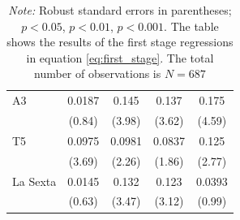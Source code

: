 \documentclass[12pt]{article}
\begin{document}
\begin{table}[htbp]
\begin{tabular}{lcccc}
		A3             &  0.0187         &  0.145\sym{***}&  0.137\sym{***}&  0.175\sym{***}\\
		&  (0.84)         &  (3.98)         &  (3.62)         &  (4.59)         \\
		T5             &  0.0975\sym{***}&  0.0981\sym{*}  &  0.0837         &  0.125\sym{**}  \\
		&  (3.69)         &  (2.26)         &  (1.86)         &  (2.77)         \\
		La Sexta       &  0.0145         &  0.132\sym{***}&  0.123\sym{**} &  0.0393         \\
		&  (0.63)         &  (3.47)         &  (3.12)         &  (0.99)         \\
		\hline\hline
	\end{tabular}
	
	\caption*{\scriptsize\emph{Note:} Robust standard errors in  parentheses;\quad \sym{*} $p<0.05$, \sym{**} $p<0.01$, \sym{***} $p<0.001$. The table shows the results of the first stage regressions in equation \ref{eq:first_stage}. The total number of observations is $N=687$ }
	

\end{table}

	
	
	
	
	
	
\end{document}
